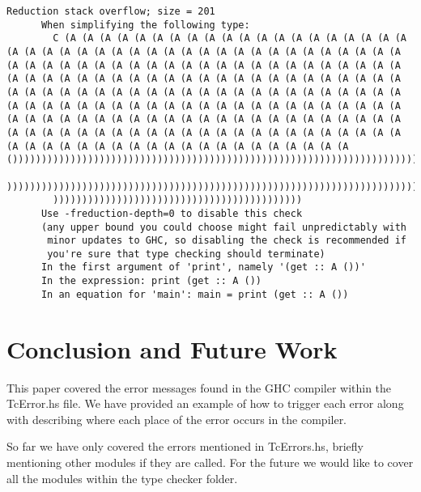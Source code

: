 \documentclass[a4paper]{article}
\begin{document}
\begin{lstlisting}[label={lst: T??.0.2}, numbers=none, caption={Error}]
 Reduction stack overflow; size = 201
      When simplifying the following type:
        C (A (A (A (A (A (A (A (A (A (A (A (A (A (A (A (A (A (A (A (A (A (A (A (A (A (A (A (A (A (A (A (A (A (A (A (A (A (A (A (A (A (A (A (A (A (A (A (A (A (A (A (A (A (A (A (A (A (A (A (A (A (A (A (A (A (A (A (A (A (A (A (A (A (A (A (A (A (A (A (A (A (A (A (A (A (A (A (A (A (A (A (A (A (A (A (A (A (A (A (A (A (A (A (A (A (A (A (A (A (A (A (A (A (A (A (A (A (A (A (A (A (A (A (A (A (A (A (A (A (A (A (A (A (A (A (A (A (A (A (A (A (A (A (A (A (A (A (A (A (A (A (A (A (A (A (A (A (A (A (A (A (A (A (A (A (A (A (A (A (A (A (A (A (A (A (A (A (A (A (A (A (A (A (A (A (A (A (A (A (A (A (A (A (A (A (A (A (A (A (A (A ()))))))))))))))))))))))))))))))))))))))))))))))))))))))))))))))))))))))))))))))))))
        ))))))))))))))))))))))))))))))))))))))))))))))))))))))))))))))))))))))))))))
        )))))))))))))))))))))))))))))))))))))))))))
      Use -freduction-depth=0 to disable this check
      (any upper bound you could choose might fail unpredictably with
       minor updates to GHC, so disabling the check is recommended if
       you're sure that type checking should terminate)
      In the first argument of 'print', namely '(get :: A ())'
      In the expression: print (get :: A ())
      In an equation for 'main': main = print (get :: A ())

\end{lstlisting}


\section{Conclusion and Future Work}

This paper covered the error messages found in the GHC compiler within the TcError.hs file. We have provided an example of how to trigger each error along with describing where each place of the error occurs in the compiler.

So far we have only covered the errors mentioned in TcErrors.hs, briefly mentioning other modules if they are called. For the future we would like to cover all the modules within the type checker folder.




\end{document}
